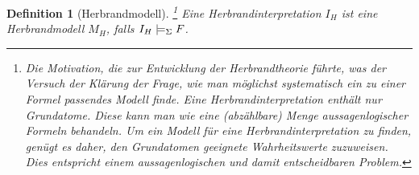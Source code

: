 \documentclass[a4paper, 11pt]{book}
\newtheorem{Def}{Definition }[section]
\begin{document}
{\begin{Def}[Herbrandmodell] 
\footnote{Die Motivation, die zur Entwicklung der Herbrandtheorie führte, was der Versuch der Klärung der Frage, wie man möglichst systematisch ein zu einer Formel passendes Modell finde. Eine Herbrandinterpretation enthält nur Grundatome. Diese kann man wie eine (abzählbare) Menge aussagenlogischer Formeln behandeln. Um ein Modell für eine Herbrandinterpretation zu finden, genügt es daher, den Grundatomen geeignete Wahrheitswerte zuzuweisen. Dies entspricht einem aussagenlogischen und damit entscheidbaren Problem.}
Eine Herbrandinterpretation $ I_H $ ist eine Herbrandmodell $ M_H $, falls $ I_H \models_{\footnotesize{\Sigma}} F $.
\end{Def}

\textcolor{blue}{
}}
\end{document}
